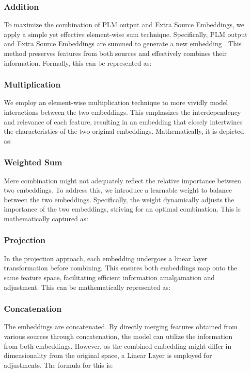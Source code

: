 \documentclass[conference]{IEEEtran}
\begin{document}
\subsubsection{Addition}
To maximize the combination of PLM output and Extra Source Embeddings, we apply a simple yet effective element-wise sum technique. Specifically, PLM output  and Extra Source Embeddings  are summed to generate a new embedding . This method preserves features from both sources and effectively combines their information. Formally, this can be represented as:


\subsubsection{Multiplication}
We employ an element-wise multiplication technique to more vividly model interactions between the two embeddings. This emphasizes the interdependency and relevance of each feature, resulting in an embedding that closely intertwines the characteristics of the two original embeddings. Mathematically, it is depicted as:



\subsubsection{Weighted Sum}
Mere combination might not adequately reflect the relative importance between two embeddings. To address this, we introduce a learnable weight to balance between the two embeddings. Specifically, the weight  dynamically adjusts the importance of the two embeddings, striving for an optimal combination. This is mathematically captured as:


\subsubsection{Projection}
In the projection approach, each embedding undergoes a linear layer transformation before combining. This ensures both embeddings map onto the same feature space, facilitating efficient information amalgamation and adjustment. This can be mathematically represented as:


\subsubsection{Concatenation}
The embeddings are concatenated. By directly merging features obtained from various sources through concatenation, the model can utilize the information from both embeddings. However, as the combined embedding might differ in dimensionality from the original space, a Linear Layer is employed for adjustments. The formula for this is:
\end{document}

